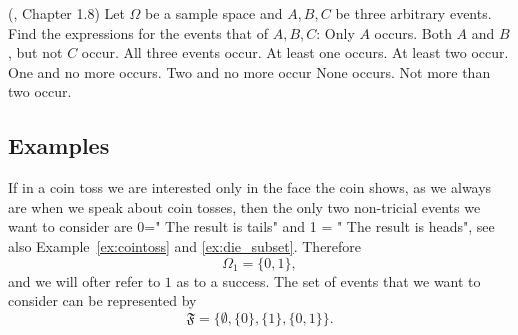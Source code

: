 \begin{ExerciseList}
	\Exercise (\cite{Feller}, Chapter 1.8) Let $\Omega$ be a sample space and $A,B, C$ be three arbitrary events. Find the expressions for the events that of $A,B,C$:
        \Question Only $A$ occurs.
	\Question  Both $A$ and $B$, but not $C$ occur. 
	\Question  All three events occur. 
	\Question  At least one occurs.
	\Question  At least two occur. 
	\Question  One and no more occurs.
	\Question  Two and no more occur 
	\Question  None occurs. 
	\Question  Not more than two occur.
	
%
%
\end{ExerciseList}

\subsection{Examples}

\begin{example}
If in a coin toss we are interested only in the face the coin shows, as we always are when we speak about coin tosses, then the only two non-tricial events we want to consider are  0=" The result is tails" and 1 = " The result is heads", see also Example~\ref{ex:cointoss} and \ref{ex:die_subset}. Therefore 
	\begin{equation}
		\Omega_1=\{0,1\},
	\end{equation}
	and we will ofter refer to $1$ as to a success. The set of events that we want to consider can be represented by 
	\begin{equation}
		\mathfrak F = \{\emptyset, \{0\}, \{1\},\{0,1\}\}.
	\end{equation}
\end{example}

